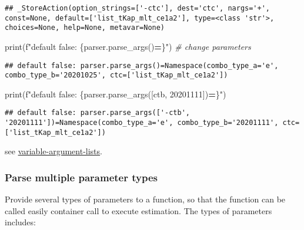 \documentclass[
]{book}
\newenvironment{Shaded}{\begin{snugshade}}{\end{snugshade}}
\newcommand{\BuiltInTok}[1]{#1}
\newcommand{\CommentTok}[1]{\textcolor[rgb]{0.56,0.35,0.01}{\textit{#1}}}
\newcommand{\NormalTok}[1]{#1}
\newcommand{\OperatorTok}[1]{\textcolor[rgb]{0.81,0.36,0.00}{\textbf{#1}}}
\newcommand{\SpecialCharTok}[1]{\textcolor[rgb]{0.00,0.00,0.00}{#1}}
\newcommand{\SpecialStringTok}[1]{\textcolor[rgb]{0.31,0.60,0.02}{#1}}
\newcommand{\StringTok}[1]{\textcolor[rgb]{0.31,0.60,0.02}{#1}}
\begin{document}
\begin{verbatim}
## _StoreAction(option_strings=['-ctc'], dest='ctc', nargs='+', const=None, default=['list_tKap_mlt_ce1a2'], type=<class 'str'>, choices=None, help=None, metavar=None)
\end{verbatim}

\begin{Shaded}
\begin{Highlighting}[]
\BuiltInTok{print}\NormalTok{(}\SpecialStringTok{f"default false: }\SpecialCharTok{\{}\NormalTok{parser}\SpecialCharTok{.}\NormalTok{parse\_args()}\OperatorTok{=}\SpecialCharTok{\}}\SpecialStringTok{"}\NormalTok{)}
\CommentTok{\# change parameters}
\end{Highlighting}
\end{Shaded}

\begin{verbatim}
## default false: parser.parse_args()=Namespace(combo_type_a='e', combo_type_b='20201025', ctc=['list_tKap_mlt_ce1a2'])
\end{verbatim}

\begin{Shaded}
\begin{Highlighting}[]
\BuiltInTok{print}\NormalTok{(}\SpecialStringTok{f"default false: }\SpecialCharTok{\{}\NormalTok{parser}\SpecialCharTok{.}\NormalTok{parse\_args([}\StringTok{\textquotesingle{}{-}ctb\textquotesingle{}}\NormalTok{, }\StringTok{\textquotesingle{}20201111\textquotesingle{}}\NormalTok{])}\OperatorTok{=}\SpecialCharTok{\}}\SpecialStringTok{"}\NormalTok{)}
\end{Highlighting}
\end{Shaded}

\begin{verbatim}
## default false: parser.parse_args(['-ctb', '20201111'])=Namespace(combo_type_a='e', combo_type_b='20201111', ctc=['list_tKap_mlt_ce1a2'])
\end{verbatim}

see \href{https://pymotw.com/2/argparse/\#variable-argument-lists}{variable-argument-lists}.

\hypertarget{parse-multiple-parameter-types}{%
\subsubsection{Parse multiple parameter types}\label{parse-multiple-parameter-types}}

Provide several types of parameters to a function, so that the function can be called easily container call to execute estimation. The types of parameters includes:
\end{document}

